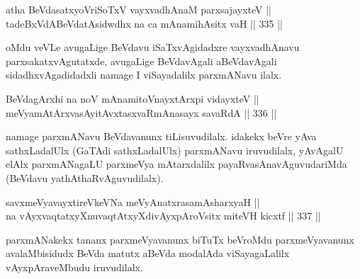 \begin{shl}
\footnotemark[1]atha BeVdasatxyoVriSoTxV vayxvadhAnaM parxsajayxteV || \\
tadeBxVdABeVdatAsidwdhx na ca mAnamihAsitx vaH \hfill || 335 ||  
\end{shl}

\begin{artha}
oMdu veVLe avugaLige BeVdavu iSaTxvAgidadxre vayxvadhAnavu
parxsakatxvAgutatxde, avugaLige BeVdavAgali aBeVdavAgali
sidadhxvAgadidadxli namage I viSayadalilx parxmANavu ilalx.
\end{artha}

\begin{shl}
BeVdagArxhi na noV mAnamitoV\s nayxtArxpi vidayxteV || \\
meVyamAtArxvasAyitAvxtasxvaRmAnasayx savaRdA \hfill || 336 ||  
\end{shl}

\begin{artha}
namage parxmANavu BeVdavanunx tiLisuvudilalx. idakekx beVre yAva
sathxLadalUlx (GaTAdi sathxLadalUlx) parxmANavu iruvudilalx, yAvAgalU
elAlx parxmANagaLU parxmeVya mAtarxdalilx payaRvasAnavAguvudariMda
(BeVdavu yathAthaRvAguvudilalx).
\end{artha}

\begin{shl}
savxmeVyavayxtireVkeVNa meVyAnatxrasamAsharxyaH || \\
na \footnotemark[1]vAyxvaqtatxyXnuvaqtAtxyXdivAyxpAroV\s sitx miteVH kicxtf \hfill || 337 ||  
\end{shl}

\begin{artha}
parxmANakekx tananx parxmeVyavanunx biTuTx beVroMdu
parxmeVyavanunx avalaMbisidudx BeVda matutx aBeVda modalAda
viSayagaLalilx vAyxpAraveMbudu iruvudilalx.
\end{artha}

